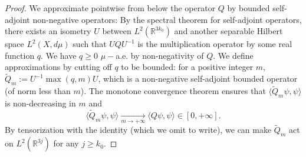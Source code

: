 \documentclass[11pt,a4paper]{article}
\theoremstyle{definition}
\theoremstyle{plain}
\newtheorem{remark}[defi]{Remark}
\begin{document}
\begin{proof}
    We approximate pointwise from below the operator $Q$ by bounded self-adjoint non-negative operators:
    By the spectral theorem for self-adjoint operators, there exists an isometry $U$ between $L^2(\mathbb{R}^{3k_0})$ and another separable Hilbert space $L^2(X,d\mu)$ such that $UQU^{-1}$ is the multiplication operator by some real function $q$. We have $q\geq 0$ $\mu-$a.e. by non-negativity of $Q$. We define approximations by cutting off $q$ to be bounded: for a positive integer $m$,
    $\tilde{Q}_{m}:=U^{-1}\max(q,m)U$, which is a non-negative self-adjoint bounded operator (of norm less than $m$).
    The monotone convergence theorem ensures that $\langle \tilde{Q}_m \psi,\psi\rangle$ is non-decreasing in $m$ and
    $$ \langle \tilde{Q}_m \psi,\psi\rangle \xrightarrow[m\rightarrow +\infty]{} \langle Q \psi, \psi\rangle\in[0,+\infty].$$
    By tensorization with the identity (which we omit to write), we can make $\tilde{Q}_m$ act on $L^2(\mathbb{R}^{3j})$ for any $j\geq k_0$.
    

\end{proof}
\end{document}
